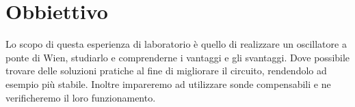 \section*{Obbiettivo}

Lo scopo di questa esperienza di laboratorio è quello di realizzare un oscillatore a ponte di Wien, studiarlo e comprenderne i vantaggi e gli svantaggi. Dove possibile trovare delle soluzioni pratiche al fine di migliorare il circuito, rendendolo ad esempio più stabile. Inoltre impareremo ad utilizzare sonde compensabili e ne verificheremo il loro funzionamento.	
